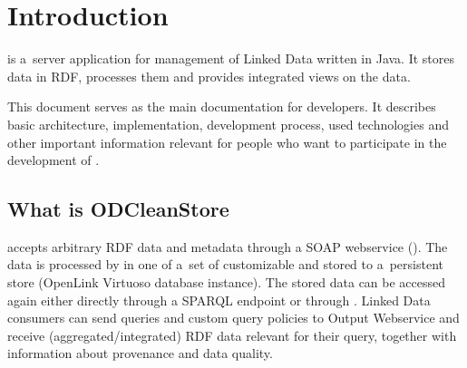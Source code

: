
\newcommand{\version}{0.3.6}
\newcommand{\documentname}{\refprogrammersguide}






\renewcommand{\contentsname}{Contents}
\tableofcontents
\bigskip

\newpage








\chapter{Introduction}
\odcs is a~server application for management of Linked Data written in Java. It stores data in RDF, processes them and provides integrated views on the data.

This document serves as the main documentation for developers. It describes basic architecture, implementation, development process, used technologies and other important information relevant for people who want to participate in the development of \odcs.

\section{What is ODCleanStore}
\odcs accepts arbitrary RDF data and metadata through a SOAP webservice (). The data is processed by  in one of a~set of customizable  and stored to a~persistent store (OpenLink Virtuoso database instance). The stored data can be accessed again either  directly through a SPARQL endpoint or through . Linked Data consumers can send queries and custom query policies to Output Webservice and receive (aggregated/integrated) RDF data relevant for their query, together with information about provenance and data quality. 


